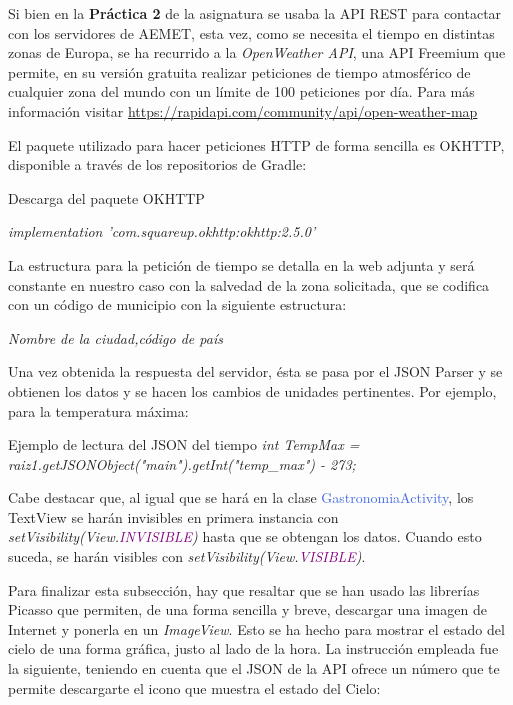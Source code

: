 \documentclass[letterpaper,twocolumn,openany,nodeprecatedcode,dvipsnames,nomultitoc]{dndbook}
\begin{document}
\begin{justify}
Si bien en la \textbf{Práctica 2} de la asignatura se usaba la API REST para contactar con los servidores de AEMET, esta vez, como se necesita el tiempo en distintas zonas de Europa, se ha recurrido a la \textit{OpenWeather API}, una API Freemium que permite, en su versión gratuita realizar peticiones de tiempo atmosférico de cualquier zona del mundo con un límite de 100 peticiones por día. Para más información visitar \url{https://rapidapi.com/community/api/open-weather-map}
\vspace{3pt}

El paquete utilizado para hacer peticiones HTTP de forma sencilla es OKHTTP, disponible a través de los repositorios de Gradle:
\begin{DndSidebar}{Descarga del paquete OKHTTP}
\centering
\par \textit{implementation \textcolor{OliveGreen}{'com.squareup.okhttp:okhttp:2.5.0'}}
\end{DndSidebar}
    
La estructura para la petición de tiempo se detalla en la web adjunta y será constante en nuestro caso con la salvedad de la zona solicitada, que se codifica con un código de municipio con la siguiente estructura: \par \textit{Nombre de la ciudad,código de país}

Una vez obtenida la respuesta del servidor, ésta se pasa por el JSON Parser y se obtienen los datos y se hacen los cambios de unidades pertinentes. Por ejemplo, para la temperatura máxima:

\begingroup
\DndSetThemeColor[PhbMauve]
\begin{DndSidebar}{Ejemplo de lectura del JSON del tiempo}
\textit{int TempMax = raiz1.getJSONObject("main").getInt("temp\_max") - 273;}
\end{DndSidebar}
\endgroup

Cabe destacar que, al igual que se hará en la clase \textcolor{RoyalBlue}{GastronomiaActivity}, los TextView se harán invisibles en primera instancia con \textit{setVisibility(View.\textcolor{purple}{INVISIBLE})} hasta que se obtengan los datos. Cuando esto suceda, se harán visibles con \textit{setVisibility(View.\textcolor{purple}{VISIBLE})}.

Para finalizar esta subsección, hay que resaltar que se han usado las librerías Picasso que permiten, de una forma sencilla y breve, descargar una imagen de Internet y ponerla en un \textit{ImageView}. Esto se ha hecho para mostrar el estado del cielo de una forma gráfica, justo al lado de la hora. La instrucción empleada fue la siguiente, teniendo en cuenta que el JSON de la API ofrece un número que te permite descargarte el icono que muestra el estado del Cielo:


\end{justify}
\end{document}
